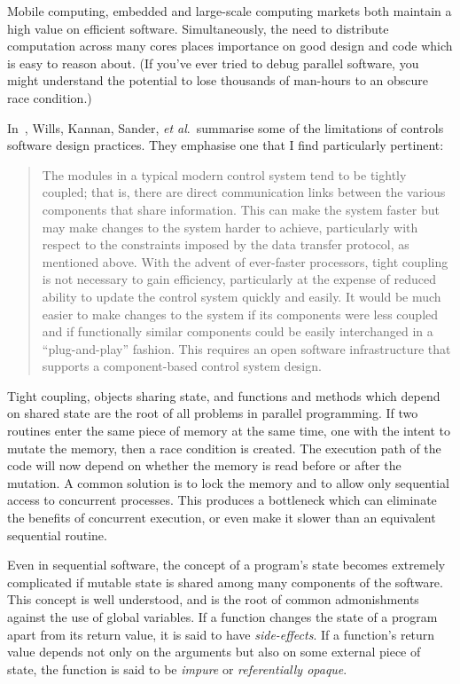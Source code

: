 Mobile computing, embedded and large-scale computing markets both maintain a
high value on efficient software. Simultaneously, the need to distribute
computation across many cores places importance on good design and code which is
easy to reason about. (If you've ever tried to debug parallel software, you
might understand the potential to lose thousands of man-hours to an obscure race
condition.)

 In~\cite[\S5.2.1]{Samad2003}, Wills, Kannan, Sander, \textit{et al}.\ summarise
 some of the limitations of controls software design practices. They emphasise
 one that I find particularly pertinent:
%
\begin{quote}
%
  The modules in a typical modern control system tend to be tightly coupled;
  that is, there are direct communication links between the various components
  that share information. This can make the system faster but may make changes
  to the system harder to achieve, particularly with respect to the constraints
  imposed by the data transfer protocol, as mentioned above. With the advent of
  ever-faster processors, tight coupling is not necessary to gain efficiency,
  particularly at the expense of reduced ability to update the control system
  quickly and easily. It would be much easier to make changes to the system if
  its components were less coupled and if functionally similar components could
  be easily interchanged in a ``plug-and-play'' fashion. This requires an open
  software infrastructure that supports a component-based control system
  design.
%
\end{quote}

Tight coupling, objects sharing state, and functions and methods which depend on
shared state are the root of all problems in parallel programming. If two
routines enter the same piece of memory at the same time, one with the intent to
mutate the memory, then a race condition is created. The execution path of the
code will now depend on whether the memory is read before or after the mutation.
A common solution is to lock the memory and to allow only sequential access to
concurrent processes. This produces a bottleneck which can eliminate the
benefits of concurrent execution, or even make it slower than an equivalent
sequential routine.

Even in sequential software, the concept of a program's state becomes extremely
complicated if mutable state is shared among many components of the software.
This concept is well understood, and is the root of common admonishments against
the use of global variables. If a function changes the state of a program apart
from its return value, it is said to have
\emph{side-effects}. If a function's return value depends
not only on the arguments but also on some external piece of state, the function
is said to be \emph{impure} or \emph{referentially
opaque}.

